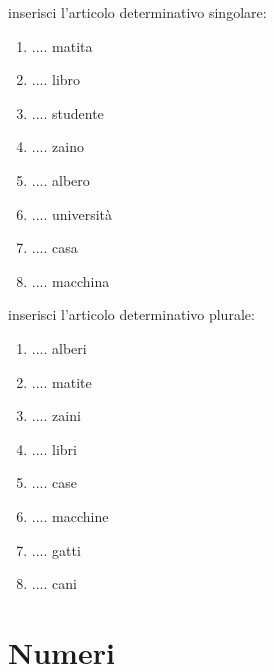 \documentclass[letter,11pt]{article}
\newcommand{\myCode}[1]{\colorbox{gray!30}{#1}}
\begin{document}
\vskip 0.1in
\myCode{inserisci l'articolo determinativo singolare: }

\begin{multicols}{2}
\begin{enumerate}
    \item .... matita
    \item .... libro
    \item .... studente
    \item .... zaino
    \item .... albero
    \item .... università
    \item .... casa
    \item .... macchina
\end{enumerate}
\end{multicols}

\vskip 0.1in
\myCode{inserisci l'articolo determinativo plurale: }

\begin{multicols}{2}
\begin{enumerate}
    \item .... alberi
    \item .... matite
    \item .... zaini
    \item .... libri
    \item .... case
    \item .... macchine
    \item .... gatti
    \item .... cani
\end{enumerate}
\end{multicols}

\vskip 0.5in

\section*{Numeri}
\vskip 0.2in
\end{document}
